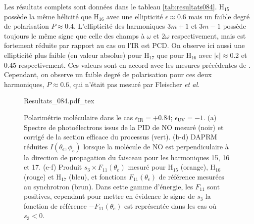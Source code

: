 Les résultats complets sont données dans le tableau \ref{tab:resultats084}. H$_{15}$ possède la même hélicité que H$_{16}$ avec une ellipticité $\epsilon \approx 0.6$ mais un faible degré de polarisation $P \approx 0.4$. L'ellipticité des harmoniques $3m+1$ et $3m-1$ possède toujours le même signe que celle des champs à $\omega$ et $2\omega$ respectivement, mais est fortement réduite par rapport au cas ou l'IR est PCD. On observe ici aussi une ellipticité plus faible (en valeur absolue) pour H$_{17}$ que pour H$_{16}$ avec $|\epsilon| \approx 0.2$ et 0.45 respectivement. Ces valeurs sont en accord avec les mesures précédentes de . Cependant, on observe un faible degré de polarisation pour ces deux harmoniques, $P \approx 0.6$, qui n'était pas mesuré par Fleischer \textit{et al.}

\begin{figure}
\centering
\def\svgwidth{\textwidth}
{Resultats_084.pdf_tex}
\caption{Polarimétrie moléculaire dans le cas $\epsilon_{\text{IR}} = +0.84$; $\epsilon_{\text{UV}} = -1$. (a) Spectre de photoélectrons issus de la PID de NO mesuré (noir) et corrigé de la section efficace du processus (vert). (b-d) DAPRM réduites $I(\theta_e,\phi_e)$ lorsque la molécule de NO est perpendiculaire à la direction de propagation du faisceau pour les harmoniques 15, 16 et 17. (e-f) Produit $s_3 \times F_{11}(\theta_e)$ mesuré pour H$_{15}$ (orange), H$_{16}$ (rouge) et H$_{17}$ (bleu), et fonctions $F_{11}(\theta_e)$ de référence mesurées au synchrotron (brun). Dans cette gamme d'énergie, les $F_{11}$ sont positives, cependant pour mettre en évidence le signe de $s_3$ la fonction de référence $-F_{11}(\theta_e)$ est représentée dans les cas où $s_3 <0$.} 
\label{fig:Resultats_084}
\end{figure}

